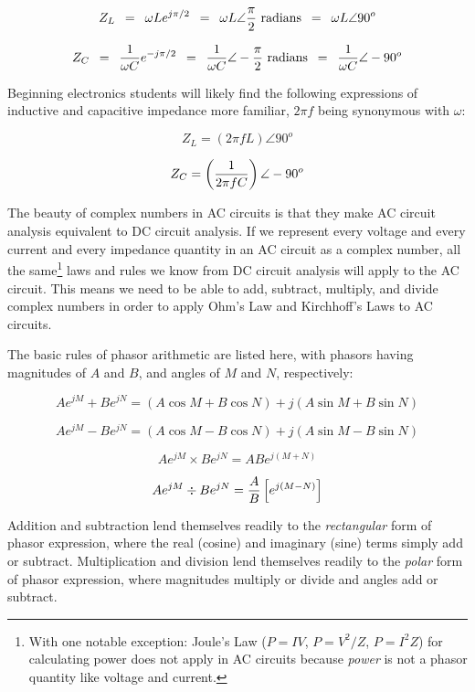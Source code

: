 $$Z_L \hskip 5pt = \hskip 5pt \omega L e^{j \pi /2} \hskip 5pt = \hskip 5pt \omega L \angle {\pi \over 2} \hbox{ radians} \hskip 5pt = \hskip 5pt \omega L \angle 90^{o}$$

$$Z_C \hskip 5pt = \hskip 5pt {1 \over \omega C} e^{- j \pi /2} \hskip 5pt = \hskip 5pt {1 \over \omega C} \angle -{\pi \over 2} \hbox{ radians} \hskip 5pt = \hskip 5pt {1 \over \omega C} \angle -90^{o}$$

Beginning electronics students will likely find the following expressions of inductive and capacitive impedance more familiar, $2 \pi f$ being synonymous with $\omega$:

$$Z_L = (2 \pi f L) \angle 90^{o}$$

$$Z_C = \left({1 \over 2 \pi f C}\right) \angle -90^{o}$$

\vskip 10pt

\filbreak

The beauty of complex numbers in AC circuits is that they make AC circuit analysis equivalent to DC circuit analysis.  If we represent every voltage and every current and every impedance quantity in an AC circuit as a complex number, all the same\footnote{With one notable exception: Joule's Law ($P = IV$, $P = V^2 / Z$, $P = I^2 Z$) for calculating power does not apply in AC circuits because \textit{power} is not a phasor quantity like voltage and current.} laws and rules we know from DC circuit analysis will apply to the AC circuit.  This means we need to be able to add, subtract, multiply, and divide complex numbers in order to apply Ohm's Law and Kirchhoff's Laws to AC circuits.  

The basic rules of phasor arithmetic are listed here, with phasors having magnitudes of $A$ and $B$, and angles of $M$ and $N$, respectively:

$$Ae^{jM} + Be^{jN} = (A \cos M + B \cos N) + j (A \sin M + B \sin N)$$

$$Ae^{jM} - Be^{jN} = (A \cos M - B \cos N) + j (A \sin M - B \sin N)$$

$$Ae^{jM} \times Be^{jN} = ABe^{j(M + N)}$$

$$Ae^{jM} \div Be^{jN} = {A \over B} \left[ e^{j(M - N)} \right]$$

Addition and subtraction lend themselves readily to the \textit{rectangular} form of phasor expression, where the real (cosine) and imaginary (sine) terms simply add or subtract.  Multiplication and division lend themselves readily to the \textit{polar} form of phasor expression, where magnitudes multiply or divide and angles add or subtract.

